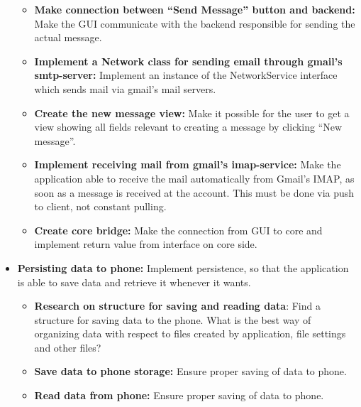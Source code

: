 \begin{itemize}
\begin{itemize}
\item{}\textbf{Make connection between “Send Message” button and backend:} Make the GUI communicate with the backend responsible for sending the actual message.
\item{}\textbf{Implement a Network class for sending email through gmail’s smtp-server:} Implement an instance of the NetworkService interface which sends mail via gmail’s mail servers.
\item{}\textbf{Create the new message view:} Make it possible for the user to get a view showing all fields relevant to creating a message by clicking “New message”.
\item{}\textbf{Implement receiving mail from gmail’s imap-service:} Make the application able to receive the mail automatically from Gmail’s IMAP, as soon as a message is received at the account. This must be done via push to client, not constant pulling.
\item{}\textbf{Create core bridge:} Make the connection from GUI to core and implement return value from interface on core side.
\end{itemize}
\item{}\textbf{Persisting data to phone:} Implement persistence, so that the application is able to save data and retrieve it whenever it wants.
\begin{itemize}
\item{}\textbf{Research on structure for saving and reading data}: Find a structure for saving data to the phone. What is the best way of organizing data with respect to files created by application, file settings and other files?
\item{}\textbf{Save data to phone storage:} Ensure proper saving of data to phone.
\item{}\textbf{Read data from phone:} Ensure proper saving of data to phone.
\end{itemize}
\end{itemize}
